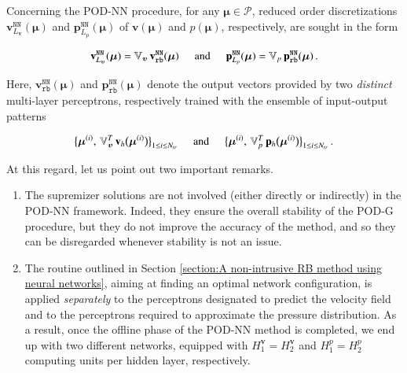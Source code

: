 \documentclass[longtitle]{elsarticle}
\numberwithin{equation}{section}
\theoremstyle{theorem}
\theoremstyle{definition}
\theoremstyle{remark}
\theoremstyle{proposition}
\numberwithin{figure}{section}
\newcommand{\bg}[1]{\boldsymbol{#1}}
\begin{document}
		Concerning the POD-NN procedure, for any $\bg{\mu} \in \mathcal{P}$, reduced order discretizations $\mathbf{v}_{L_{\bg{v}}}^{\texttt{NN}}(\bg{\mu})$ and $\mathbf{p}_{L_p}^{\texttt{NN}}(\bg{\mu})$ of $\bg{v}(\bg{\mu})$ and $p(\bg{\mu})$, respectively, are sought in the form
		\begin{linenomath}\begin{equation*}
			\mathbf{v}_{L_{\bg{v}}}^{\texttt{NN}}(\bg{\mu}) = \mathbb{V}_{\bg{v}} \, \mathbf{v}_{\texttt{rb}}^{\texttt{NN}}(\bg{\mu}) \hspace*{0.5cm} \text{and} \hspace*{0.5cm} \mathbf{p}_{L_p}^{\texttt{NN}}(\bg{\mu}) = \mathbb{V}_{p} \, \mathbf{p}_{\texttt{rb}}^{\texttt{NN}}(\bg{\mu}) \, .
		\end{equation*}\end{linenomath}
		Here, $\mathbf{v}_{\texttt{rb}}^{\texttt{NN}}(\bg{\mu})$ and $\mathbf{p}_{\texttt{rb}}^{\texttt{NN}}(\bg{\mu})$ denote the output vectors provided by two \emph{distinct} multi-layer perceptrons, respectively trained with the ensemble of input-output patterns
		\begin{linenomath}\begin{equation*}
			\big\lbrace \bg{\mu}^{(i)}, \, \mathbb{V}_{\bg{v}}^T \, \mathbf{v}_h \big( \bg{\mu}^{(i)} \big) \big\rbrace_{1 \leq i \leq N_{tr}} \hspace*{0.5cm} \text{and} \hspace*{0.5cm} \big\lbrace \bg{\mu}^{(i)}, \, \mathbb{V}_{p}^T \, \mathbf{p}_h \big( \bg{\mu}^{(i)} \big) \big\rbrace_{1 \leq i \leq N_{tr}} \, .
		\end{equation*}\end{linenomath}
		At this regard, let us point out two important remarks.
		\begin{enumerate}[label=(\roman*)]
			\item The supremizer solutions are not involved (either directly or indirectly) in the POD-NN framework. Indeed, they ensure the overall stability of the POD-G procedure, but they do not improve the accuracy of the method, and so they can be disregarded whenever stability is not an issue.
			\item The routine outlined in Section \ref{section:A non-intrusive RB method using neural networks}, aiming at finding an optimal network configuration, is applied \emph{separately} to the perceptrons designated to predict the velocity field and to the perceptrons required to approximate the pressure distribution. As a result, once the offline phase of the POD-NN method is completed, we end up with two different networks, equipped with $H_1^{\bg{v}} = H_2^{\bg{v}}$ and $H_1^p = H_2^p$ computing units per hidden layer, respectively.  
		\end{enumerate}
\end{document}
